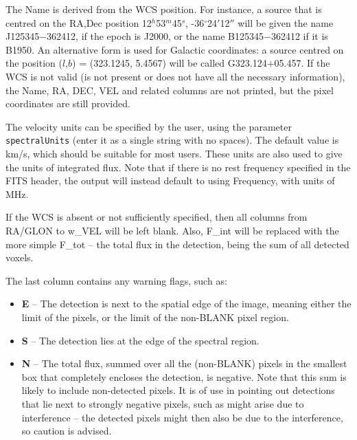 The Name is derived from the WCS position. For instance, a source that
is centred on the RA,Dec position 12$^h$53$^m$45$^s$,
-36$^\circ$24$'$12$''$ will be given the name J125345$-$362412, if the
epoch is J2000, or the name B125345$-$362412 if it is B1950. An
alternative form is used for Galactic coordinates: a source centred on
the position ($l$,$b$) = (323.1245, 5.4567) will be called
G323.124$+$05.457. If the WCS is not valid (\ie is not present or does
not have all the necessary information), the Name, RA, DEC, VEL and
related columns are not printed, but the pixel coordinates are still
provided.

The velocity units can be specified by the user, using the parameter
\texttt{spectralUnits} (enter it as a single string with no
spaces). The default value is km/s, which should be suitable for most
users. These units are also used to give the units of integrated
flux. Note that if there is no rest frequency specified in the FITS
header, the \duchamp output will instead default to using Frequency,
with units of MHz.

If the WCS is absent or not sufficiently specified, then all columns
from RA/GLON to w\_VEL will be left blank. Also, F\_int will be
replaced with the more simple F\_tot -- the total flux in the
detection, being the sum of all detected voxels.

The last column contains any warning flags, such as:
\begin{itemize}
\item \textbf{E} -- The detection is next to the spatial edge of the image,
meaning either the limit of the pixels, or the limit of the non-BLANK
pixel region.
\item \textbf{S} -- The detection lies at the edge of the spectral region. 
\item \textbf{N} -- The total flux, summed over all the (non-BLANK)
pixels in the smallest box that completely encloses the detection, is
negative. Note that this sum is likely to include non-detected
pixels. It is of use in pointing out detections that lie next to
strongly negative pixels, such as might arise due to interference --
the detected pixels might then also be due to the interference, so
caution is advised.
\end{itemize}


